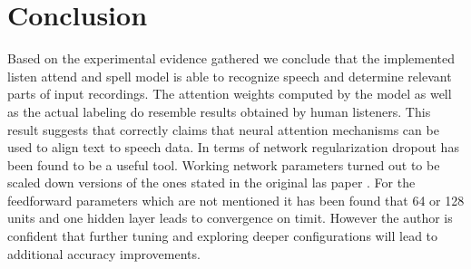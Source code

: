 \documentclass{article}
\begin{document}
\section{Conclusion}
\label{sec:conc}
Based on the experimental evidence gathered we conclude that the implemented listen attend and spell model is able to recognize speech and determine relevant parts of input recordings. The attention weights computed by the model as well as the actual labeling do resemble results obtained by human listeners. This result suggests that \cite{Chan2015} correctly claims that neural attention mechanisms can be used to align text to speech data. In terms of network regularization dropout \cite{Srivastava2014} has been found to be a useful tool. Working network parameters turned out to be scaled down versions of the ones stated in the original las paper \cite{Chan2015}. For the feedforward parameters which are not mentioned it has been found that 64 or 128 units and one hidden layer leads to convergence on timit. However the author is confident that further tuning and exploring deeper configurations will lead to additional accuracy improvements.

%

\end{document}
